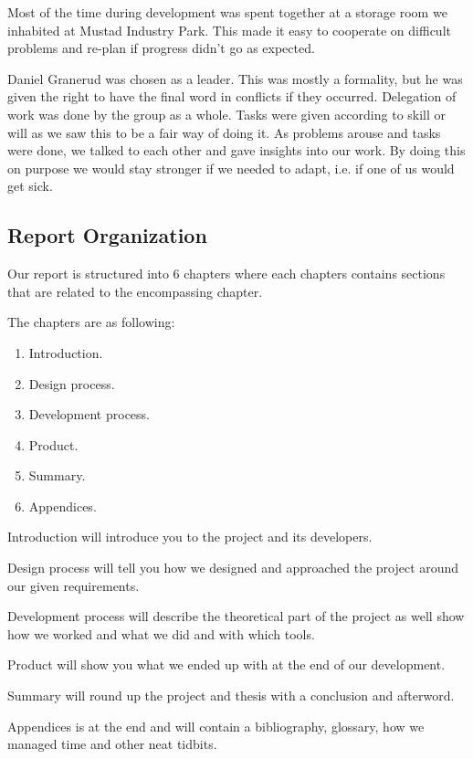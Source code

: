 Most of the time during development was spent together at a storage room we
inhabited at Mustad Industry Park. This made it easy to cooperate on difficult
problems and re-plan if progress didn’t go as expected.

Daniel Granerud was chosen as a leader. This was mostly a formality, but he was
given the right to have the final word in conflicts if they occurred.
Delegation of work was done by the group as a whole. Tasks were given according
to skill or will as we saw this to be a fair way of doing it. As problems
arouse and tasks were done, we talked to each other and gave insights into our
work. By doing this on purpose we would stay stronger if we needed to adapt,
i.e. if one of us would get sick.


\subsection{Report Organization}
\label{subsec:report_organization}

Our report is structured into 6 chapters where each chapters contains sections that are related to the encompassing chapter.

The chapters are as following:

\begin{enumerate}
	\item Introduction.
	\item Design process.
	\item Development process.
	\item Product.
	\item Summary.
	\item Appendices.
\end{enumerate}

Introduction will introduce you to the project and its developers.


Design process will tell you how we designed and approached the project around our given requirements.


Development process will describe the theoretical part of the project as well show how we worked and what we did and with which tools.


Product will show you what we ended up with at the end of our development.


Summary will round up the project and thesis with a conclusion and afterword.


Appendices is at the end and will contain a bibliography, glossary, how we managed time and other neat tidbits.

